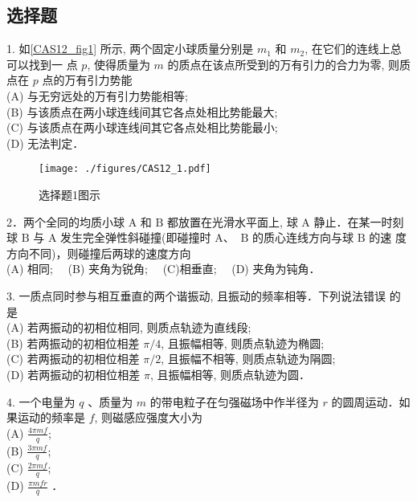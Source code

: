 \subsection{选择题}
1. 如\autoref{CAS12_fig1} 所示, 两个固定小球质量分别是 $m_{1}$ 和 $m_{2}$, 在它们的连线上总可以找到一
点 $p$, 使得质量为 $m$ 的质点在该点所受到的万有引力的合力为零, 则质点在 $p$
点的万有引力势能\\
(A) 与无穷远处的万有引力势能相等;\\
(B) 与该质点在两小球连线间其它各点处相比势能最大;\\
(C) 与该质点在两小球连线间其它各点处相比势能最小;\\
(D) 无法判定．
\begin{figure}[ht]
\centering
\texttt{[image: ./figures/CAS12\_1.pdf]}
\caption{选择题1图示} \label{CAS12_fig1}
\end{figure}
2．两个全同的均质小球 $\mathrm{A}$ 和 $\mathrm{B}$ 都放置在光滑水平面上, 球 $\mathrm{A}$ 静止．在某一时刻 球 $\mathrm{B}$ 与 $\mathrm{A}$ 发生完全弹性斜碰撞(即碰撞时 $\mathrm{A}$、 $\mathrm{~B}$ 的质心连线方向与球 $\mathrm{B}$ 的速 度方向不同)，则碰撞后两球的速度方向\\
(A) 相同;$\quad$
(B) 夹角为锐角;$\quad$
(C)相垂直;$\quad$
(D) 夹角为钝角．

3. 一质点同时参与相互垂直的两个谐振动, 且振动的频率相等．下列说法错误 的是\\
(A) 若两振动的初相位相同, 则质点轨迹为直线段;\\
(B) 若两振动的初相位相差 $\pi / 4$, 且振幅相等, 则质点轨迹为椭圆;\\
(C) 若两振动的初相位相差 $\pi / 2$, 且振幅不相等, 则质点轨迹为䧎圆;\\
(D) 若两振动的初相位相差 $\pi$, 且振幅相等, 则质点轨迹为圆．

4. 一个电量为 $q$ 、质量为 $m$ 的带电粒子在匀强磁场中作半径为 $r$ 的圆周运动．如果运动的频率是 $f$, 则磁感应强度大小为\\
(A) $\frac{4 \pi m f}{q}$;\\
(B) $\frac{3 \pi m f}{q}$;\\
(C) $\frac{2 \pi m f}{q}$;\\
(D) $\frac{\pi m f r}{q}$ ．